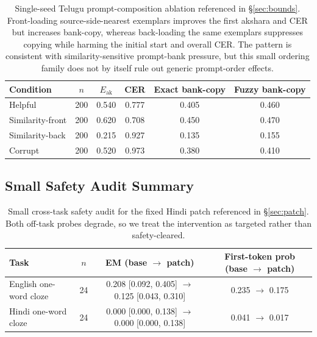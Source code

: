 \documentclass{article}
\begin{document}
\begin{table}[t]
\centering
\small
\setlength{\tabcolsep}{9pt}
\begin{tabular}{lccccc}
\toprule
\textbf{Condition} & \textbf{$n$} & \textbf{$E_{\mathrm{ak}}$} & \textbf{CER} & \textbf{Exact bank-copy} & \textbf{Fuzzy bank-copy} \\
\midrule
Helpful           & 200 & 0.540 & 0.777 & 0.405 & 0.460 \\
Similarity-front  & 200 & 0.620 & 0.708 & 0.450 & 0.470 \\
Similarity-back   & 200 & 0.215 & 0.927 & 0.135 & 0.155 \\
Corrupt           & 200 & 0.520 & 0.973 & 0.380 & 0.410 \\
\bottomrule
\end{tabular}
\caption{Single-seed Telugu prompt-composition ablation referenced in \S\ref{sec:bounds}. Front-loading source-side-nearest exemplars improves the first akshara and CER but increases bank-copy, whereas back-loading the same exemplars suppresses copying while harming the initial start and overall CER. The pattern is consistent with similarity-sensitive prompt-bank pressure, but this small ordering family does not by itself rule out generic prompt-order effects.}
\label{tab:promptcomp}
\end{table}

\subsection{Small Safety Audit Summary}\label{app:safety}

\begin{table}[t]
\centering
\scriptsize
\setlength{\tabcolsep}{7pt}
\begin{tabular}{lccc}
\toprule
\textbf{Task} & \textbf{$n$} & \textbf{EM (base $\to$ patch)} & \textbf{First-token prob (base $\to$ patch)} \\
\midrule
English one-word cloze & 24 & 0.208 [0.092, 0.405] $\to$ 0.125 [0.043, 0.310] & 0.235 $\to$ 0.175 \\
Hindi one-word cloze   & 24 & 0.000 [0.000, 0.138] $\to$ 0.000 [0.000, 0.138] & 0.041 $\to$ 0.017 \\
\bottomrule
\end{tabular}
\caption{Small cross-task safety audit for the fixed Hindi patch referenced in \S\ref{sec:patch}. Both off-task probes degrade, so we treat the intervention as targeted rather than safety-cleared.}
\label{tab:safety}
\end{table}
\end{document}
